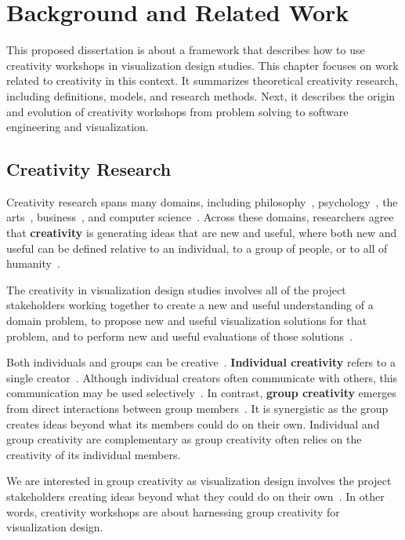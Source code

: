 
\chapter{Background and Related Work}
\label{ch:related}
This proposed dissertation is about a framework that describes how to use creativity workshops in visualization design studies. This chapter focuses on work related to creativity in this context. It summarizes theoretical creativity research, including definitions, models, and research methods. Next, it describes the origin and evolution of creativity workshops from problem solving to software engineering and visualization.

\section{Creativity Research}

Creativity research spans many domains, including philosophy~\cite{Poincare1982,Boden2004,Hadamard1945}, psychology~\cite{Sawyer2006,Plucker1999,Kaufman2006}, the arts~\cite{Dewey1934,Csikszentmihalyi1997,Sawyer2003}, business~\cite{Osborn1953,DeBono1983,VonOech1986}, and computer science~\cite{Shneiderman2005,Hewett2005,Boden2004}. Across these domains, researchers agree that {\bf creativity} is generating ideas that are new and useful, where both new and useful can be defined relative to an individual, to a group of people, or to all of humanity~\cite{Mayer1999}. 

The creativity in visualization design studies involves all of the project stakeholders working together to create a new and useful understanding of a domain problem, to propose new and useful visualization solutions for that problem, and to perform new and useful evaluations of those solutions~\cite{Sedlmair2012}. 

Both individuals and groups can be creative~\cite{Sawyer2003}. {\bf Individual creativity} refers to a single creator~\cite{Sawyer2006}. Although individual creators often communicate with others, this communication may be used selectively~\cite{Sawyer2006}. In contrast, {\bf group creativity} emerges from direct interactions between group members~\cite{Sawyer2003}. It is synergistic as the group creates ideas beyond what its members could do on their own. Individual and group creativity are complementary as group creativity often relies on the creativity of its individual members.

We are interested in group creativity as visualization design involves the project stakeholders creating ideas beyond what they could do on their own~\cite{Goodwin2013}. In other words, creativity workshops are about harnessing group creativity for visualization design.

